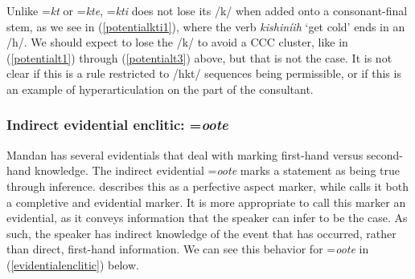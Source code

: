 Unlike =\textit{kt} or =\textit{kte}, =\textit{kti} does not lose its /k/ when added onto a consonant-final stem, as we see in (\ref{potentialkti1}), where the verb \textit{kishiníih} `get cold' ends in an /h/. We should expect to lose the /k/ to avoid a CCC cluster, like in (\ref{potentialt1}) through (\ref{potentialt3}) above, but that is not the case. It is not clear if this is a rule restricted to /hkt/ sequences being permissible, or if this is an example of hyperarticulation on the part of the consultant.

\subsubsection{Indirect evidential enclitic: =\textit{oote}}\label{encliticOOTE}

Mandan has several evidentials that deal with marking first-hand versus second-hand knowledge. The indirect evidential =\textit{oote} marks a statement as being true through inference. \citet[474]{hollow1970} describes this as a perfective aspect marker, while \citet[17]{kennard1936} calls it both a completive and evidential marker. It is more appropriate to call this marker an evidential, as it conveys information that the speaker can infer to be the case. As such, the speaker has indirect knowledge of the event that has occurred, rather than direct, first-hand information. We can see this behavior for =\textit{oote} in (\ref{evidentialenclitic}) below.

